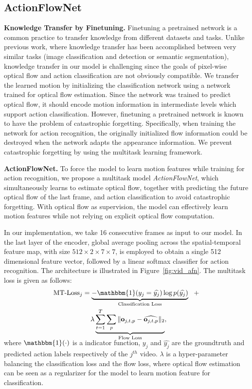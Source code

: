 \documentclass[10pt,twocolumn,letterpaper]{article}
\begin{document}
\subsection{ActionFlowNet}\label{sec:multi}\noindent\textbf{Knowledge Transfer by Finetuning.}
Finetuning a pretrained network is a common practice to transfer knowledge from different datasets and tasks.
Unlike previous work, where knowledge transfer has been accomplished between very similar tasks (image classification and detection or semantic segmentation), knowledge transfer in our model is challenging since the goals of pixel-wise optical flow and action classification are not obviously compatible. 
We transfer the learned motion by initializing the classification network using a network trained for optical flow estimation.
Since the network was trained to predict optical flow, it should encode motion information in intermediate levels which support action classification.
However, finetuning a pretrained network is known to have the problem of catastrophic forgetting.
Specifically, when training the network for action recognition, the originally initialized flow information could be destroyed when the network adapts the appearance information.
We prevent catastrophic forgetting by using the multitask learning framework.

\noindent\textbf{ActionFlowNet.}
To force the model to learn motion features while training for action recognition, we propose a multitask model \emph{ActionFlowNet}, which simultaneously learns to estimate optical flow, together with predicting the future optical flow of the last frame, and action classification to avoid catastrophic forgetting.
With optical flow as supervision, the model can effectively learn motion features while not relying on explicit optical flow computation.

In our implementation, we take 16 consecutive frames as input to our model.
In the last layer of the encoder, global average pooling across the spatial-temporal feature map, with size $512 \times 2\times 7 \times 7$, is employed to obtain a single 512 dimensional feature vector, followed by a linear softmax classifier for action recognition.  The architecture is illustrated in Figure~\ref{fig:vid_afn}.
The multitask loss is given as follows:
\vspace{-1em}\begin{multline} 
    \text{MT-Loss}_{j} = \underbrace{-\mathbbm{1}(y_j = \widehat{y_j})\log p(\widehat{y_j})}_{\text{Classification Loss}}~~ +\\
    ~~\lambda \underbrace{\sum_{t=1}^T\sum_{p} \|\mathbf{o}_{j,t,p} - \widehat{\mathbf{o}_{j,t,p}} \|_2}_{\text{Flow Loss}},
\label{eq:multi_mt_loss}
  \vspace{-1em}
\end{multline}
where $\mathbbm{1}(\cdot)$ is a indicator function, $y_j$ and $\widehat{y_j}$ are the groundtruth and predicted action labels respectively of the $j^{th}$ video.
$\lambda$ is a hyper-parameter balancing the classification loss and the flow loss, where optical flow estimation can be seen as a regularizer for the model to learn motion feature for classification.
\end{document}

